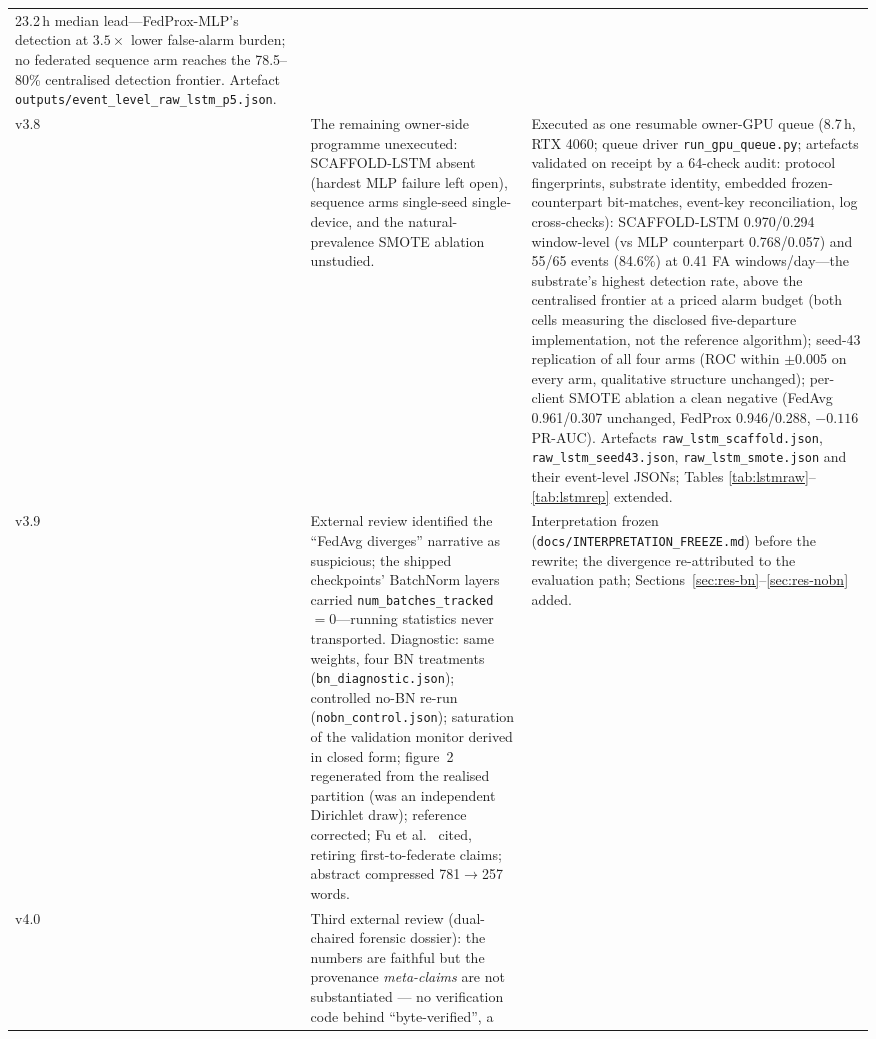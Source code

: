 \begin{longtable}{@{}p{} >{\raggedright\arraybackslash}p{} >{\raggedright\arraybackslash}p{}@{}}
23.2\,h median lead---FedProx-MLP's detection at $3.5\times$ lower
false-alarm burden; no federated sequence arm reaches the
78.5--80\% centralised detection frontier. Artefact
\texttt{outputs/event\_level\_raw\_lstm\_p5.json}. \\
\addlinespace[2pt]
v3.8 & The remaining owner-side programme unexecuted: SCAFFOLD-LSTM
absent (hardest MLP failure left open), sequence arms single-seed
single-device, and the natural-prevalence SMOTE ablation unstudied. &
Executed as one resumable owner-GPU queue (8.7\,h, RTX 4060;
queue driver \texttt{run\_gpu\_queue.py}; artefacts validated on
receipt by a 64-check audit: protocol fingerprints, substrate
identity, embedded frozen-counterpart bit-matches, event-key
reconciliation, log cross-checks): SCAFFOLD-LSTM 0.970/0.294
window-level (vs MLP counterpart 0.768/0.057) and 55/65 events
(84.6\%) at 0.41 FA windows/day---the substrate's highest detection
rate, above the centralised frontier at a priced alarm budget (both
cells measuring the disclosed five-departure implementation, not
the reference algorithm);
seed-43 replication of all four arms (ROC within $\pm$0.005 on
every arm, qualitative structure unchanged); per-client SMOTE
ablation a clean negative (FedAvg 0.961/0.307 unchanged, FedProx
0.946/0.288, $-0.116$ PR-AUC). Artefacts
\texttt{raw\_lstm\_scaffold.json}, \texttt{raw\_lstm\_seed43.json},
\texttt{raw\_lstm\_smote.json} and their event-level JSONs;
Tables \ref{tab:lstmraw}--\ref{tab:lstmrep}
extended. \\
\addlinespace[2pt]
v3.9 & External review identified the ``FedAvg diverges'' narrative as
suspicious; the shipped checkpoints' BatchNorm layers carried
\texttt{num\_batches\_tracked}$=0$---running statistics never
transported. Diagnostic: same weights, four BN treatments
(\texttt{bn\_diagnostic.json}); controlled no-BN re-run
(\texttt{nobn\_control.json}); saturation of the validation monitor
derived in closed form; figure~2 regenerated from the realised
partition (was an independent Dirichlet draw); reference \cite{zhao2018}
corrected; Fu et al.\ \cite{fu2023} cited, retiring first-to-federate
claims; abstract compressed 781$\to$257 words. & Interpretation frozen
(\texttt{docs/INTERPRETATION\_FREEZE.md}) before the rewrite; the
divergence re-attributed to the evaluation path;
Sections~\ref{sec:res-bn}--\ref{sec:res-nobn} added. \\
\addlinespace[2pt]
v4.0 & Third external review (dual-chaired forensic dossier): the
numbers are faithful but the provenance \emph{meta-claims} are not
substantiated --- no verification code behind ``byte-verified'', a

\end{longtable}
